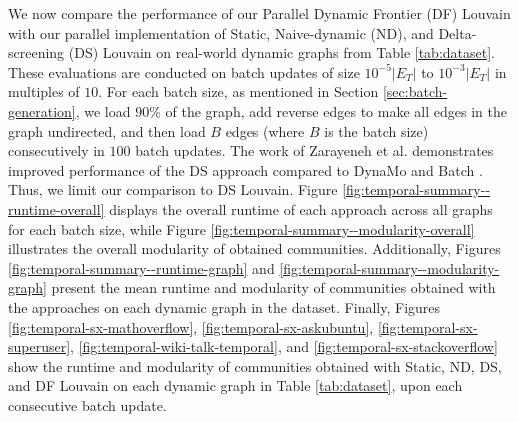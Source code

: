 We now compare the performance of our Parallel Dynamic Frontier (DF) Louvain with our parallel implementation of Static, Naive-dynamic (ND), and Delta-screening (DS) Louvain on real-world dynamic graphs from Table \ref{tab:dataset}. These evaluations are conducted on batch updates of size $10^{-5}|E_T|$ to $10^{-3}|E_T|$ in multiples of $10$. For each batch size, as mentioned in Section \ref{sec:batch-generation}, we load $90\%$ of the graph, add reverse edges to make all edges in the graph undirected, and then load $B$ edges (where $B$ is the batch size) consecutively in $100$ batch updates. The work of Zarayeneh et al. \cite{com-zarayeneh21} demonstrates improved performance of the DS approach compared to DynaMo \cite{com-zhuang19} and Batch \cite{com-chong13}. Thus, we limit our comparison to DS Louvain. Figure \ref{fig:temporal-summary--runtime-overall} displays the overall runtime of each approach across all graphs for each batch size, while Figure \ref{fig:temporal-summary--modularity-overall} illustrates the overall modularity of obtained communities. Additionally, Figures \ref{fig:temporal-summary--runtime-graph} and \ref{fig:temporal-summary--modularity-graph} present the mean runtime and modularity of communities obtained with the approaches on each dynamic graph in the dataset. Finally, Figures \ref{fig:temporal-sx-mathoverflow}, \ref{fig:temporal-sx-askubuntu}, \ref{fig:temporal-sx-superuser}, \ref{fig:temporal-wiki-talk-temporal}, and \ref{fig:temporal-sx-stackoverflow} show the runtime and modularity of communities obtained with Static, ND, DS, and DF Louvain on each dynamic graph in Table \ref{tab:dataset}, upon each consecutive batch update.

